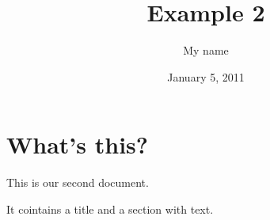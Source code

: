 \documentclass[a4paper,11pt]{article}
\begin{document}
\title{Example 2}
\author{My name}
\date{January 5, 2011}
\maketitle
\section{What's this?}

This is our second document. 

It cointains a title and a section with text.
\end{document}
